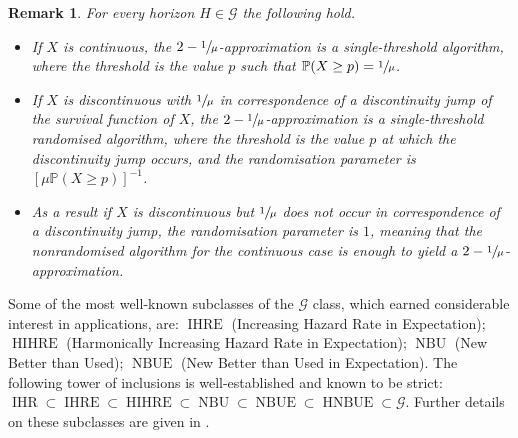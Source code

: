 \documentclass[11pt, a4paper, twoside]{article}
\newcommand{\PP}{\mathbb{P}}
\newcommand{\PGF}{\mathcal{G}}
\DeclareMathOperator{\IHR}{IHR}
\DeclareMathOperator{\IHRE}{IHRE}
\DeclareMathOperator{\HIHRE}{HIHRE}
\DeclareMathOperator{\NBU}{NBU}
\DeclareMathOperator{\NBUE}{NBUE}
\DeclareMathOperator{\HNBUE}{HNBUE}
\newtheorem{remark}{Remark}[section]
\numberwithin{equation}{section}
\begin{document}
	\begin{remark}\label{algorithm}
		For every horizon $H\in\PGF$ the following hold.
		\begin{itemize}[noitemsep]
			\item If $X$ is continuous, the $2-\sfrac{1}{\mu}$-approximation is a single-threshold algorithm, where the threshold is the value $p$ such that $\PP(X\ge p)=\sfrac{1}{\mu}$.
			\item If $X$ is discontinuous with $\sfrac{1}{\mu}$ in correspondence of a discontinuity jump of the survival function of $X$, the $2-\sfrac{1}{\mu}$-approximation is a single-threshold randomised algorithm, where the threshold is the value $p$ at which the discontinuity jump occurs, and the randomisation parameter is $[\mu\PP(X\ge p)]^{-1}$. 
			\item As a result if $X$ is discontinuous but $\sfrac{1}{\mu}$ does not occur in correspondence of a discontinuity jump, the randomisation parameter is $1$, meaning that the nonrandomised algorithm for the continuous case is enough to yield a $2-\sfrac{1}{\mu}$-approximation.
		\end{itemize}
	\end{remark}
	Some of the most well-known subclasses of the $\PGF$ class, which earned considerable interest in applications, are: $\IHRE$ (Increasing Hazard Rate in Expectation); $\HIHRE$ (Harmonically Increasing Hazard Rate in Expectation); $\NBU$ (New Better than Used); $\NBUE$ (New Better than Used in Expectation). The following tower of inclusions is well-established \cite{BraqRoyXie01,Rol75,Klef82} and known to be strict: $\IHR\subset\IHRE\subset\HIHRE\subset\NBU\subset\NBUE\subset\HNBUE\subset\PGF$. Further details on these subclasses are given in .
		
\end{document}
